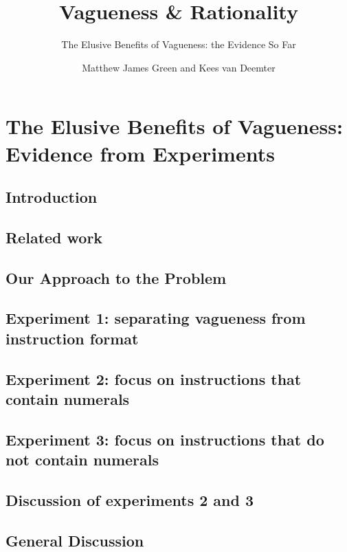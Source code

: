 \documentclass[ %
  graybox       %
 ,envcountchap  %
 ,sectrefs      %
]{svmono}
\begin{document}
\author{Matthew James Green and Kees van Deemter}
\title{Vagueness \& Rationality}
\subtitle{The Elusive Benefits of Vagueness: the Evidence So Far}
\date{}
\maketitle
\frontmatter
\tableofcontents
\mainmatter
\chapter{The Elusive Benefits of Vagueness: Evidence from Experiments}\label{chapterlabel}

\section{Introduction}\label{introduction}
\section{Related work}\label{related-work}
\section{Our Approach to the Problem}\label{our-approach-to-the-problem}
\section{Experiment 1: separating vagueness from instruction format}\label{e1}
\section{Experiment 2: focus on instructions that contain numerals}\label{e2}
\section{Experiment 3: focus on instructions that do not contain numerals}\label{e3}
\section{Discussion of experiments 2 and 3}\label{discussion-of-e2-and-e3}
\section{General Discussion}\label{general-discussion}
\backmatter


\backmatter
\end{document}
